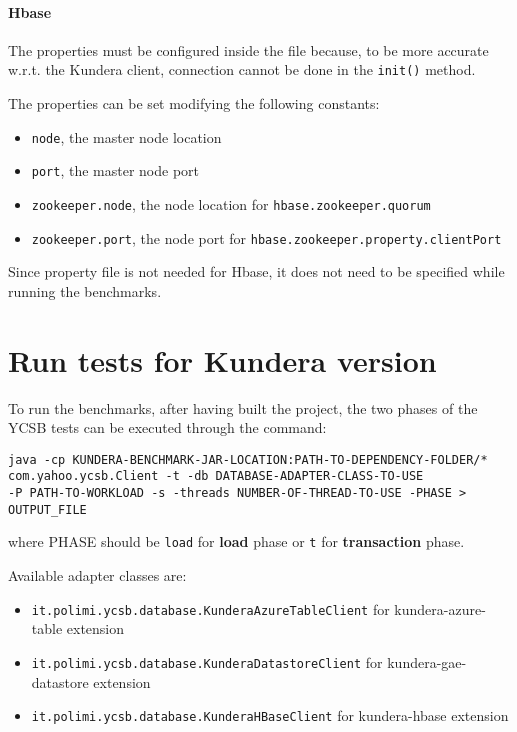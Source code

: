 \paragraph{Hbase}
The properties must be configured inside the file because, to be more accurate w.r.t. the Kundera client, connection cannot be done in the \texttt{init()} method. 

\noindent The properties can be set modifying the following constants:
\begin{itemize}
\item \texttt{node}, the master node location
\item \texttt{port}, the master node port
\item \texttt{zookeeper.node}, the node location for \texttt{hbase.zookeeper.quorum}
\item \texttt{zookeeper.port}, the node port for \texttt{hbase.zookeeper.property.clientPort}
\end{itemize}

\noindent Since property file is not needed for Hbase, it does not need to be specified while running the benchmarks.

\section{Run tests for Kundera version}
\label{appendix:ycsb-kundera}
To run the benchmarks, after having built the project, the two phases of the YCSB tests can be executed through the command:

\begin{verbatim}
java -cp KUNDERA-BENCHMARK-JAR-LOCATION:PATH-TO-DEPENDENCY-FOLDER/*
com.yahoo.ycsb.Client -t -db DATABASE-ADAPTER-CLASS-TO-USE
-P PATH-TO-WORKLOAD -s -threads NUMBER-OF-THREAD-TO-USE -PHASE > OUTPUT_FILE
\end{verbatim}

\noindent where PHASE should be \texttt{load} for \textbf{load} phase or \texttt{t} for \textbf{transaction} phase.

\newparagraph Available adapter classes are:
\begin{itemize}
\item \texttt{it.polimi.ycsb.database.KunderaAzureTableClient} for kundera-azure-table extension
\item \texttt{it.polimi.ycsb.database.KunderaDatastoreClient} for kundera-gae-datastore extension
 \item\texttt{it.polimi.ycsb.database.KunderaHBaseClient} for kundera-hbase extension
\end{itemize}

